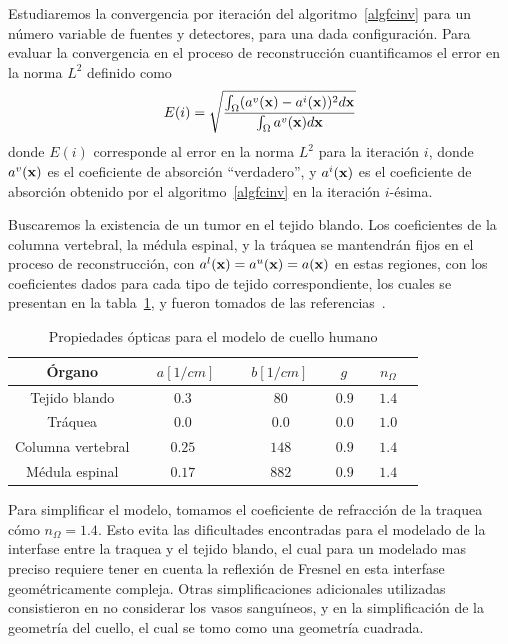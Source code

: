 Estudiaremos la convergencia por iteración del algoritmo~\ref{algfcinv} 
para un número variable de fuentes y detectores, para una dada configuración. 
Para evaluar la convergencia en el proceso de reconstrucción cuantificamos 
el error en la norma $L^2$ definido como
\begin{equation}
\begin{split}
\begin{aligned}
E(i)=\sqrt{\frac{\int_{\Omega}(a^v(\mathbf{x})-a^i(\mathbf{x}))^2  d\mathbf{x}}{\int_{\Omega}a^v(\mathbf{x}) d\mathbf{x}}}
\end{aligned}
\end{split}
\label{eq:errl2}
\end{equation}
donde $E(i)$ corresponde al error en la norma $L^2$ para la iteración $i$, 
donde $a^v(\mathbf{x})$ es el coeficiente de absorción ``verdadero'', y $a^i(\mathbf{x})$ 
es el coeficiente de absorción obtenido por el algoritmo~\ref{algfcinv} 
en la iteración $i$-ésima. 

Buscaremos la existencia de un tumor en el tejido blando. 
Los coeficientes de la columna vertebral, la médula espinal, y la tráquea 
se mantendrán fijos en el proceso de reconstrucción, con $a^l(\mathbf{x})=a^u(\mathbf{x})=a(\mathbf{x})$ 
en estas regiones, con los coeficientes dados para cada tipo de tejido correspondiente, 
los cuales se presentan en la tabla~\ref{tab:cuello}, y fueron tomados de las referencias~\cite{Bashkatov2011,Dehaes2011,Fujii2016}.

\begin{table}[h!]
\caption{Propiedades ópticas para el modelo de cuello humano}
\vspace{-0.3cm}
\begin{center}
\begin{tabular}{ccccccc}
\hline
Órgano & ~ $a[1/cm]$ & ~ & $b[1/cm]$ ~ & $g$ ~ & $n_{\Omega}$ \\
\hline
Tejido blando & ~$0.3$ & ~ & $80$ ~ &$0.9$ ~  & $1.4$ \\
Tráquea & ~$0.0$ & ~ & $0.0$ ~ &$0.0$ ~ &  $1.0$\\
Columna vertebral & ~$0.25$ & ~ & $148$ ~ &$0.9$   ~ &  $1.4$ \\
Médula espinal & ~$0.17$ & ~ & $882$ ~ &$0.9$  ~ &  $1.4$ \\
\hline
\end{tabular}
\label{tab:cuello}
\end{center}
\end{table}
Para simplificar el modelo, tomamos el coeficiente de refracción 
de la traquea cómo $n_{\Omega}=1.4$. Esto evita las dificultades 
encontradas para el modelado de la interfase entre la traquea y el tejido blando, 
el cual para un modelado mas preciso requiere tener en cuenta la reflexión 
de Fresnel en esta interfase geométricamente compleja. Otras simplificaciones 
adicionales utilizadas consistieron en no considerar los vasos sanguíneos, y en la 
simplificación de la geometría del cuello, el cual se tomo como una geometría 
cuadrada.

